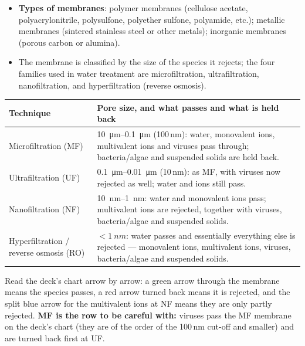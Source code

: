 \documentclass[10pt,a4paper]{article}
\newcommand{\spsub}[1]{\par\addvspace{7pt}\noindent{\color{accent}\bfseries #1}\par\addvspace{3pt}\nopagebreak}
\begin{document}
\spsub{Membrane filters}
\begin{itemize}
  \item \textbf{Types of membranes}: polymer membranes (cellulose acetate, polyacrylonitrile, polysulfone, polyether sulfone, polyamide, etc.); metallic membranes (sintered stainless steel or other metals); inorganic membranes (porous carbon or alumina).
  \item The membrane is classified by the size of the species it rejects; the four families used in water treatment are microfiltration, ultrafiltration, nanofiltration, and hyperfiltration (reverse osmosis).
\end{itemize}
\begin{formulabox}
{\small
\begin{tabularx}{\linewidth}{@{}lX@{}}
\toprule
\textbf{Technique} & \textbf{Pore size, and what passes and what is held back}\\
\midrule
Microfiltration (MF) & \SI{10}{\micro\meter}--\SI{0.1}{\micro\meter} (100\,nm): water, monovalent ions, multivalent ions and viruses pass through; bacteria/algae and suspended solids are held back.\\
Ultrafiltration (UF) & \SI{0.1}{\micro\meter}--\SI{0.01}{\micro\meter} (10\,nm): as MF, with viruses now rejected as well; water and ions still pass.\\
Nanofiltration (NF) & \SI{10}{nm}--\SI{1}{nm}: water and monovalent ions pass; multivalent ions are rejected, together with viruses, bacteria/algae and suspended solids.\\
Hyperfiltration / reverse osmosis (RO) & $<\SI{1}{nm}$: water passes and essentially everything else is rejected --- monovalent ions, multivalent ions, viruses, bacteria/algae and suspended solids.\\
\bottomrule
\end{tabularx}}
\vspace{2pt}
{\small Read the deck's chart arrow by arrow: a green arrow through the membrane means the species passes, a red arrow turned back means it is rejected, and the split blue arrow for the multivalent ions at NF means they are only partly rejected. \textbf{MF is the row to be careful with:} viruses pass the MF membrane on the deck's chart (they are of the order of the 100\,nm cut-off and smaller) and are turned back first at UF.}
\end{formulabox}
\end{document}
